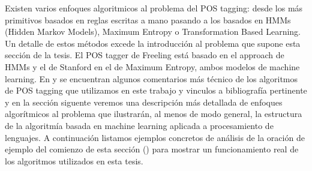 Existen varios enfoques algoritmicos al problema del POS tagging: desde los más primitivos basados en reglas escritas a mano pasando a los basados en HMMs (Hidden Markov Models), Maximum Entropy o Transformation Based Learning. Un detalle de estos métodos excede la introducción al problema que supone esta sección de la tesis. El POS tagger de Freeling está basado en el approach de HMMs y el de Stanford en el de Maximum Entropy, ambos modelos de machine learning. En  y  se encuentran algunos comentarios más técnico de los algoritmos de POS tagging que utilizamos en este trabajo y vinculos a bibliografía pertinente y en la sección siguente  veremos una descripción más detallada de enfoques algorítmicos al problema que ilustrarán, al menos de modo general, la estructura de la algoritmía basada en machine learning aplicada a procesamiento de lenguajes. 
A continuación listamos ejemplos concretos de análisis de la oración de ejemplo del comienzo de esta sección () para mostrar un funcionamiento real de los algoritmos utilizados en esta tesis. 


